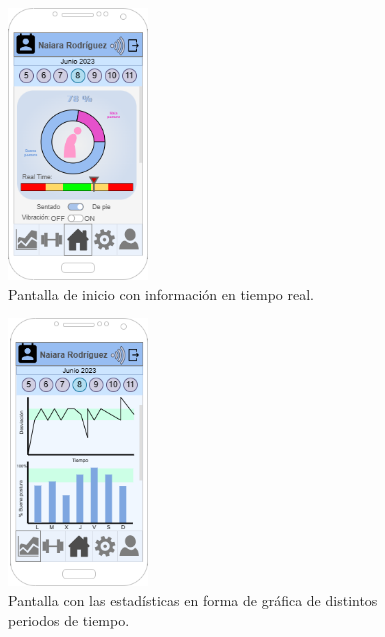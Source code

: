 \begin{figure}[h]
    \centering
    \includegraphics[width=0.33\textwidth]{img/PantallaInicio.png}
    \caption{Pantalla de inicio con información en tiempo real.}
    \label{fig:inicio} %
\end{figure}

\begin{figure}[h]
    \centering
    \includegraphics[width=0.33\textwidth]{img/Estadisticas.png}
    \caption{Pantalla con las estadísticas en forma de gráfica de distintos periodos de tiempo.}
    \label{fig:estadisticas} %
\end{figure}

